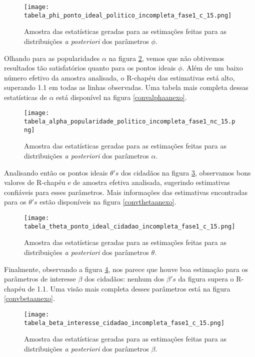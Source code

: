 \documentclass[
	12pt,				%
	openright,			%
	twoside,			%
	a4paper,			%
	english,			%
	brazil				%
	]{abntex2}
\begin{document}
 \begin{figure}[!htbp]
    \centering
    \texttt{[image: tabela\_phi\_ponto\_ideal\_politico\_incompleta\_fase1\_c\_15.png]}
    \caption{Amostra das estatísticas geradas para as estimações feitas para as distribuições \textit{a posteriori} dos parâmetros $\phi$.}
    \label{convphi}
 \end{figure}
 
 Olhando para as popularidades $\alpha$ na figura \ref{convalpha}, vemos que não obtivemos resultados tão satisfatórios quanto para os pontos ideais $\phi$. Além de um baixo número efetivo da amostra analisada, o R-chapéu das estimativas está alto, superando 1.1 em todas as linhas observadas. Uma tabela mais completa dessas estatísticas de $\alpha$ está disponível na figura \ref{convalphaanexo}.
 
 \begin{figure}[!htbp]
    \centering
    \texttt{[image: tabela\_alpha\_popularidade\_politico\_incompleta\_fase1\_nc\_15.png]}
    \caption{Amostra das estatísticas geradas para as estimações feitas para as distribuições \textit{a posteriori} dos parâmetros $\alpha$.}
    \label{convalpha}
 \end{figure}
 \newpage
 Analisando então os pontos ideais $\theta's$ dos cidadãos na figura \ref{convtheta}, observamos bons valores de R-chapéu e de amostra efetiva analisada, sugerindo estimativas confiáveis para esses parâmetros. Mais informações das estimativas encontradas para os $\theta's$ estão disponíveis na figura \ref{convthetaanexo}.

 \begin{figure}[!htbp]
    \centering
    \texttt{[image: tabela\_theta\_ponto\_ideal\_cidadao\_incompleta\_fase1\_c\_15.png]}
    \caption{Amostra das estatísticas geradas para as estimações feitas para as distribuições \textit{a posteriori} dos parâmetros $\theta$.}
    \label{convtheta}
 \end{figure}
 
 Finalmente, observando a figura \ref{convbeta}, nos parece que houve boa estimação para os parâmetros de interesse $\beta$ dos cidadãos: nenhum dos $\beta's$ da figura supera o R-chapéu de 1.1. Uma visão mais completa desses parâmetros está na figura \ref{convbetaanexo}.

 \begin{figure}[!htbp]
    \centering
    \texttt{[image: tabela\_beta\_interesse\_cidadao\_incompleta\_fase1\_c\_15.png]}
    \caption{Amostra das estatísticas geradas para as estimações feitas para as distribuições \textit{a posteriori} dos parâmetros $\beta$.}
    \label{convbeta}
 \end{figure}
 
\end{document}
